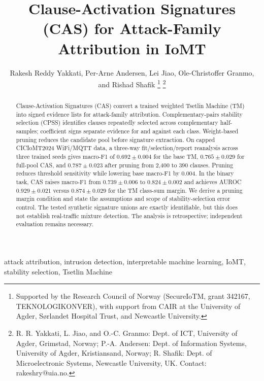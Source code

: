 \documentclass[conference]{IEEEtran}
\begin{document}
\title{Clause-Activation Signatures (CAS) for Attack-Family Attribution in IoMT}

\author{Rakesh Reddy Yakkati, Per-Arne Andersen, Lei Jiao, Ole-Christoffer Granmo, and Rishad Shafik
\thanks{Supported by the Research Council of Norway (SecureIoTM, grant 342167, TEKNOLOGIKONVER), with support from CAIR at the University of Agder, S\o rlandet Hospital Trust, and Newcastle University.}%
\thanks{R. R. Yakkati, L. Jiao, and O.-C. Granmo: Dept. of ICT, University of Agder, Grimstad, Norway; P.-A. Andersen: Dept. of Information Systems, University of Agder, Kristiansand, Norway; R. Shafik: Dept. of Microelectronic Systems, Newcastle University, UK. Contact: rakeshry@uia.no.}}

\maketitle

\begin{abstract}
Clause-Activation Signatures (CAS) convert a trained weighted Tsetlin
Machine (TM) into signed evidence lists for attack-family attribution.
Complementary-pairs stability selection (CPSS) identifies clauses
repeatedly selected across complementary half-samples; coefficient
signs separate evidence for and against each class. Weight-based pruning reduces the candidate pool before
signature extraction. On capped CICIoMT2024 WiFi/MQTT data, a three-way
fit/selection/report reanalysis across three trained seeds gives macro-F1
of $0.692\pm0.004$ for the base TM, $0.765\pm0.029$ for full-pool CAS,
and $0.787\pm0.023$ after pruning from 2,400 to 390 clauses. Pruning
reduces threshold sensitivity while lowering base macro-F1 by 0.004.
In the binary task, CAS raises macro-F1 from $0.739\pm0.006$ to
$0.824\pm0.002$ and achieves AUROC $0.929\pm0.021$ versus
$0.874\pm0.029$ for the TM class-sum margin. We derive a pruning margin condition and state
the assumptions and scope of stability-selection error control.
The tested synthetic signature unions are exactly identifiable, but
this does not establish real-traffic mixture detection. The analysis is retrospective;
independent evaluation remains necessary.
\end{abstract}

\begin{IEEEkeywords}
attack attribution, intrusion detection, interpretable machine learning,
IoMT, stability selection, Tsetlin Machine
\end{IEEEkeywords}
\end{document}
